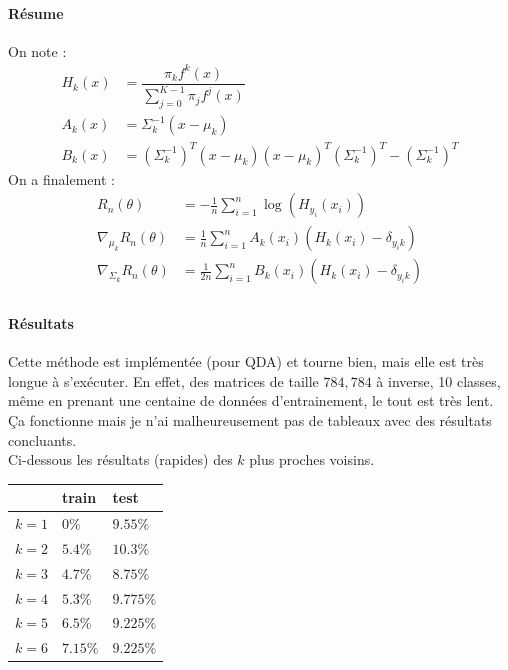\documentclass[paper=a4, fontsize=11pt]{article}
\begin{document}
\paragraph{Résume\\}
On note : 
\begin{align*}
H_k(x) &= \dfrac{\pi_kf^{k}(x)}{\sum\limits_{j=0}^{K-1} \pi_j f^{j}(x)}\\
A_k(x) &= \Sigma_{k}^{-1}(x-\mu_k)\\
B_k(x) &= (\Sigma_k^{-1})^{T}(x-\mu_k)(x-\mu_k)^{T}(\Sigma_k^{-1})^{T} - (\Sigma_k^{-1})^{T}
\end{align*}
On a finalement : 
\begin{align*}
R_n(\theta) &= -\frac{1}{n}\sum\limits_{i=1}^{n} \log(H_{y_i}(x_i))\\
\nabla_{\mu_k}R_n(\theta) &= \frac{1}{n}\sum\limits_{i=1}^{n}A_k(x_i)(H_k(x_i)-\delta_{y_ik})\\
\nabla_{\Sigma_k}R_n(\theta) &= \frac{1}{2n}\sum\limits_{i=1}^{n}B_k(x_i)(H_k(x_i)-\delta_{y_ik})\\
\end{align*}

\paragraph{Résultats}
Cette méthode est implémentée (pour QDA) et tourne bien, mais elle est très longue à s'exécuter. En effet, des matrices de taille $784,784$ à inverse, 10 classes, même en prenant une centaine de données d'entrainement, le tout est très lent. Ça fonctionne mais je n'ai malheureusement pas de tableaux avec des résultats concluants.\\
Ci-dessous les résultats (rapides) des $k$ plus proches voisins.
\begin{center}
\begin{tabular}{|R{2cm}||C{1.5cm}|C{1.5cm}|}
\hline  & train &  test \\
\hline  $k=1$ & $0\%$ & $9.55\%$ \\
\hline  $k=2$ & $5.4\%$ & $10.3\%$ \\
\hline  $k=3$ & $4.7\%$ & $8.75\%$  \\
\hline  $k=4$ & $5.3\%$ & $9.775\%$  \\
\hline  $k=5$ & $6.5\%$ & $9.225\%$ \\
\hline  $k=6$ & $7.15\%$ & $9.225\%$ \\
\hline
\end{tabular}
\end{center}
\end{document}
